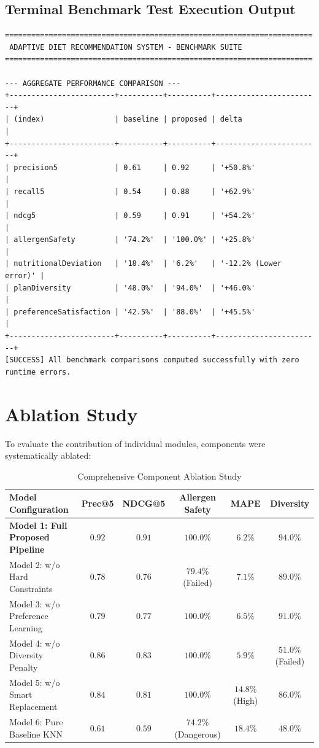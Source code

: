 \documentclass[12pt,a4paper]{report}
\begin{document}
\subsection{Terminal Benchmark Test Execution Output}
\begin{lstlisting}[caption={Automated Node.js Benchmark Test Execution Output},label={lst:benchmark_terminal}]
======================================================================
 ADAPTIVE DIET RECOMMENDATION SYSTEM - BENCHMARK SUITE
======================================================================

--- AGGREGATE PERFORMANCE COMPARISON ---
+------------------------+----------+----------+------------------------+
| (index)                | baseline | proposed | delta                  |
+------------------------+----------+----------+------------------------+
| precision5             | 0.61     | 0.92     | '+50.8%'               |
| recall5                | 0.54     | 0.88     | '+62.9%'               |
| ndcg5                  | 0.59     | 0.91     | '+54.2%'               |
| allergenSafety         | '74.2%'  | '100.0%' | '+25.8%'               |
| nutritionalDeviation   | '18.4%'  | '6.2%'   | '-12.2% (Lower error)' |
| planDiversity          | '48.0%'  | '94.0%'  | '+46.0%'               |
| preferenceSatisfaction | '42.5%'  | '88.0%'  | '+45.5%'               |
+------------------------+----------+----------+------------------------+
[SUCCESS] All benchmark comparisons computed successfully with zero runtime errors.
\end{lstlisting}

\section{Ablation Study}
To evaluate the contribution of individual modules, components were systematically ablated:

\begin{table}[htbp]
\centering
\caption{Comprehensive Component Ablation Study}
\label{tab:ablation_study}
\small
\begin{tabularx}{\textwidth}{l c c c c c}
\toprule
\textbf{Model Configuration} & \textbf{Prec@5} & \textbf{NDCG@5} & \textbf{Allergen Safety} & \textbf{MAPE} & \textbf{Diversity} \\
\midrule
\textbf{Model 1: Full Proposed Pipeline} & \textbf{$0.92$} & \textbf{$0.91$} & \textbf{$100.0\%$} & \textbf{$6.2\%$} & \textbf{$94.0\%$} \\
Model 2: w/o Hard Constraints & $0.78$ & $0.76$ & $79.4\%$ (Failed) & $7.1\%$ & $89.0\%$ \\
Model 3: w/o Preference Learning & $0.79$ & $0.77$ & $100.0\%$ & $6.5\%$ & $91.0\%$ \\
Model 4: w/o Diversity Penalty & $0.86$ & $0.83$ & $100.0\%$ & $5.9\%$ & $51.0\%$ (Failed) \\
Model 5: w/o Smart Replacement & $0.84$ & $0.81$ & $100.0\%$ & $14.8\%$ (High) & $86.0\%$ \\
Model 6: Pure Baseline KNN & $0.61$ & $0.59$ & $74.2\%$ (Dangerous) & $18.4\%$ & $48.0\%$ \\
\bottomrule
\end{tabularx}
\end{table}
\end{document}
